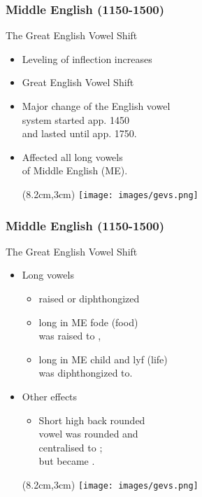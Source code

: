 \documentclass[12pt, table]{beamer}
\begin{document}
\begin{frame}
\frametitle{Middle English (1150-1500)}
The Great English Vowel Shift
\begin{itemize}
\item Leveling of inflection increases 
\item Great English Vowel Shift
\item Major change of the English vowel \\ system started app. 1450 \\ and lasted until app. 1750. 
\item Affected all long vowels \\ of Middle English (ME). 
\begin{textblock*}{10cm}(8.2cm,3cm)
\texttt{[image: images/gevs.png]}
\end{textblock*}
\end{itemize}
\end{frame}

\begin{frame}
\frametitle{Middle English (1150-1500)}
The Great English Vowel Shift
\begin{itemize}
\item Long vowels 
\begin{itemize}
\item raised or diphthongized 
\item long \textipa{[o:]} in ME fode (food) \\ was raised to \textipa{[u:]}, 
\item long \textipa{[i:]} in ME child and lyf (life) \\ was diphthongized to\textipa{[ai]}.
\end{itemize}
\item Other effects
\begin{itemize}
\item Short high back rounded \\ vowel \textipa{[U]} was rounded and \\ centralised to \textipa{[2]}; \\ but \textipa{[bUt]} became \textipa{[b2t]}.
\end{itemize}
\begin{textblock*}{10cm}(8.2cm,3cm)
\texttt{[image: images/gevs.png]}
\end{textblock*}
\end{itemize}
\end{frame}
\end{document}
